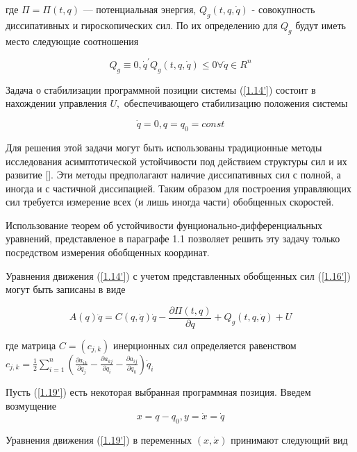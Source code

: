  где $\Pi = \Pi(t, q)$ --- потенциальная энергия, $Q_g(t, q, \dot q)$ - совокупность диссипативных и гироскопических сил. По их определению для $Q_g$ будут иметь место следующие соотношения
 
 \begin{equation} \label{1.17'}
   Q_g \equiv 0, \dot q^{'} Q_g (t, q, \dot q) \le 0 \forall \dot q \in R^n
 \end{equation}
 
Задача о стабилизации программной позиции системы (\ref{1.14'}) состоит в нахождении управления $U,$ обеспечивающего стабилизацию положения системы 

\begin{equation} \label{1.18'}
\dot q = 0, q = q_0 = const
\end{equation}

Для решения этой задачи могут быть использованы традиционные методы исследования асимптотической устойчивости под действием структуры сил и их развитие []. Эти методы предполагают наличие диссипативных сил с полной, а иногда и с частичной диссипацией. Таким образом для построения управляющих сил требуется измерение всех (и лишь иногда части) обобщенных скоростей. 

Использование теорем об устойчивости фунционально-дифференциальных уравнений, представленое в параграфе 1.1 позволяет решить эту задачу только посредством измерения обобщенных координат.

Уравнения движения (\ref{1.14'}) с учетом представленных обобщенных сил (\ref{1.16'}) могут быть записаны в виде 

 \begin{equation} \label{1.19'}
 A(q) \ddot q = C(q, \dot q) \dot q - \frac{\partial \Pi(t, q)}{\partial q} + Q_g(t, q, \dot q) + U
 \end{equation}

 где матрица $C = (c_{j,k})$ инерционных сил определяется равенством $c_{j,k} = \frac12 \sum\limits_{i =1}^{n} (\frac{\partial a_{ik} } {\partial q_j} - \frac{\partial a_{kj}}{\partial q_i} - \frac{\partial a_{ij}}{\partial q_k}) \dot q_i$

Пусть (\ref{1.19'}) есть некоторая выбранная программная позиция. Введем возмущение
\begin{equation} \label{1.20'}
x = q - q_0, y = \dot x = \dot q
\end{equation}
 
Уравнения движения (\ref{1.19'}) в переменных $(x, \dot x)$ принимают следующий вид 

